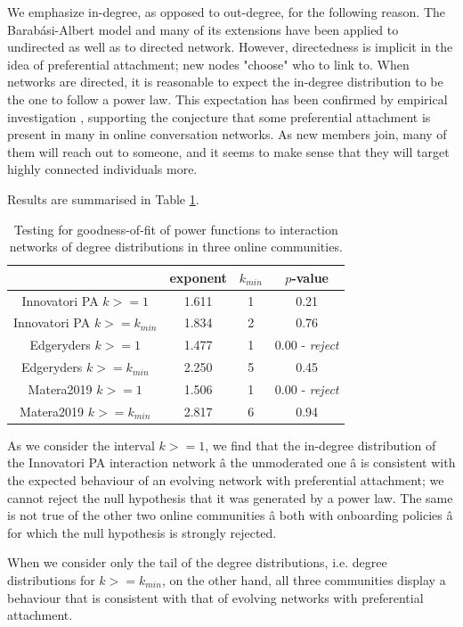 	
We emphasize in-degree, as opposed to out-degree, for the following reason. The Barab\'asi-Albert model and many of its extensions \cite{dorogovtsev2002evolution} have been applied to undirected as well as to directed network. However, directedness is implicit in the idea of preferential attachment; new nodes "choose" who to link to. When networks are directed, it is reasonable to expect the in-degree distribution to be the one to follow a power law. This expectation has been confirmed by empirical investigation \cite{dorogovtsev2002evolution}, supporting the conjecture that some preferential attachment is present in many in online conversation networks. As new members join, many of them will reach out to someone, and it seems to make sense that they will target highly connected individuals more. 

Results are summarised in Table \ref{table:goodnessOfFit}. 

\begin{table}[b]
\centering 
\begin{tabular}{| c | c | c | c |} 
\hline 
& exponent  & $k_{min}$ & $p$-value\\ 
\hline 
Innovatori PA  $k>=1$ & 1.611 & 1 & 0.21 \\
\hline 
Innovatori PA $k>=k_{min}$  & 1.834 & 2 & 0.76 \\
\hline
Edgeryders $k>=1$ & 1.477 & 1 & 0.00 - \emph{reject} \\
\hline
Edgeryders $k>=k_{min}$ & 2.250 & 5 & 0.45 \\
\hline
Matera2019 $k>=1$ & 1.506 & 1 & 0.00 - \emph{reject} \\
\hline
Matera2019 $k>=k_{min}$ & 2.817 & 6 & 0.94 \\
\hline 
\end{tabular}
\caption{Testing for goodness-of-fit of power functions to interaction networks of degree distributions in three online communities.}
\label{table:goodnessOfFit}
\end{table}

As we consider the interval  $k>=1$, we find that the in-degree distribution of the Innovatori PA interaction network â the unmoderated one â is consistent with the expected behaviour of an evolving network with preferential attachment; we cannot reject the null hypothesis that it was generated by a power law. The same is not true of the other two online communities â both with onboarding policies â for which the null hypothesis is strongly rejected.  

When we consider only the tail of the degree distributions, i.e. degree distributions for $k>=k_{min}$, on the other hand, all three communities display a behaviour that is consistent with that of evolving networks with preferential attachment.

